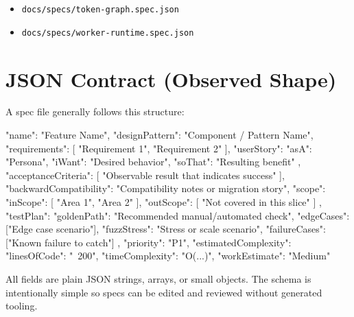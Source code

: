 \begin{itemize}
\item
  \texttt{d\allowbreak{}o\allowbreak{}c\allowbreak{}s\allowbreak{}/\allowbreak{}s\allowbreak{}p\allowbreak{}e\allowbreak{}c\allowbreak{}s\allowbreak{}/\allowbreak{}t\allowbreak{}o\allowbreak{}k\allowbreak{}e\allowbreak{}n\allowbreak{}-\allowbreak{}g\allowbreak{}r\allowbreak{}a\allowbreak{}p\allowbreak{}h\allowbreak{}.\allowbreak{}s\allowbreak{}p\allowbreak{}e\allowbreak{}c\allowbreak{}.\allowbreak{}j\allowbreak{}s\allowbreak{}o\allowbreak{}n}
\item
  \texttt{d\allowbreak{}o\allowbreak{}c\allowbreak{}s\allowbreak{}/\allowbreak{}s\allowbreak{}p\allowbreak{}e\allowbreak{}c\allowbreak{}s\allowbreak{}/\allowbreak{}w\allowbreak{}o\allowbreak{}r\allowbreak{}k\allowbreak{}e\allowbreak{}r\allowbreak{}-\allowbreak{}r\allowbreak{}u\allowbreak{}n\allowbreak{}t\allowbreak{}i\allowbreak{}m\allowbreak{}e\allowbreak{}.\allowbreak{}s\allowbreak{}p\allowbreak{}e\allowbreak{}c\allowbreak{}.\allowbreak{}j\allowbreak{}s\allowbreak{}o\allowbreak{}n}
\end{itemize}

\section{JSON Contract (Observed Shape)}\label{record-012-json-contract-observed-shape}

A spec file generally follows this structure:

\begin{CodeBlock}
{
  "name": "Feature Name",
  "designPattern": "Component / Pattern Name",
  "requirements": [
    "Requirement 1",
    "Requirement 2"
  ],
  "userStory": {
    "asA": "Persona",
    "iWant": "Desired behavior",
    "soThat": "Resulting benefit"
  },
  "acceptanceCriteria": [
    "Observable result that indicates success"
  ],
  "backwardCompatibility": "Compatibility notes or migration story",
  "scope": {
    "inScope": [
      "Area 1",
      "Area 2"
    ],
    "outScope": [
      "Not covered in this slice"
    ]
  },
  "testPlan": {
    "goldenPath": "Recommended manual/automated check",
    "edgeCases": ["Edge case scenario"],
    "fuzzStress": "Stress or scale scenario",
    "failureCases": ["Known failure to catch"]
  },
  "priority": "P1",
  "estimatedComplexity": {
    "linesOfCode": "~200",
    "timeComplexity": "O(...)",
    "workEstimate": "Medium"
  }
}
\end{CodeBlock}

All fields are plain JSON strings, arrays, or small objects. The schema is intentionally simple so specs can be edited and reviewed without generated tooling.

